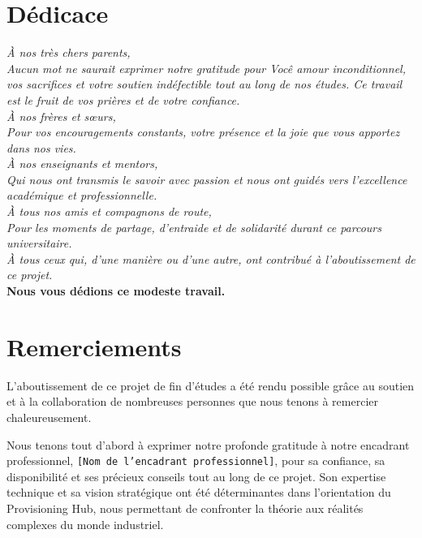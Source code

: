\chapter*{Dédicace}
\begin{center}
    \vspace*{1cm}
    \textit{À nos très chers parents, \\
    Aucun mot ne saurait exprimer notre gratitude pour Você amour inconditionnel, vos sacrifices et votre soutien indéfectible tout au long de nos études. Ce travail est le fruit de vos prières et de votre confiance.} \\
    \vspace{1cm}
    \textit{À nos frères et sœurs, \\
    Pour vos encouragements constants, votre présence et la joie que vous apportez dans nos vies.} \\
    \vspace{1cm}
    \textit{À nos enseignants et mentors, \\
    Qui nous ont transmis le savoir avec passion et nous ont guidés vers l'excellence académique et professionnelle.} \\
    \vspace{1cm}
    \textit{À tous nos amis et compagnons de route, \\
    Pour les moments de partage, d'entraide et de solidarité durant ce parcours universitaire.} \\
    \vspace{1cm}
    \textit{À tous ceux qui, d'une manière ou d'une autre, ont contribué à l'aboutissement de ce projet.} \\
    \vspace{1cm}
    \textbf{Nous vous dédions ce modeste travail.}
\end{center}
\newpage

\chapter*{Remerciements}
L'aboutissement de ce projet de fin d'études a été rendu possible grâce au soutien et à la collaboration de nombreuses personnes que nous tenons à remercier chaleureusement.

Nous tenons tout d'abord à exprimer notre profonde gratitude à notre encadrant professionnel, \texttt{[Nom de l'encadrant professionnel]}, pour sa confiance, sa disponibilité et ses précieux conseils tout au long de ce projet. Son expertise technique et sa vision stratégique ont été déterminantes dans l'orientation du Provisioning Hub, nous permettant de confronter la théorie aux réalités complexes du monde industriel.

